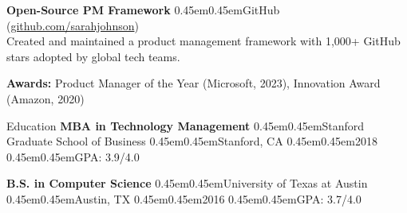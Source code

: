 \documentclass[10pt, letterpaper]{article}
\makeatletter
\renewcommand{\section}{%
  \@startsection{section}{1}{\z@}{10pt}{6pt}{%
    \Large\bfseries\color{black}%
  }%
}
\newcommand{\bull}{\kern0.45em\textbullet\kern0.45em}
\makeatother
\begin{document}
\textbf{Open-Source PM Framework} \bull GitHub (\href{https://github.com/sarahjohnson}{github.com/sarahjohnson}) \\
Created and maintained a product management framework with 1,000+ GitHub stars adopted by global tech teams.

\textbf{Awards:} Product Manager of the Year (Microsoft, 2023), Innovation Award (Amazon, 2020)

\section{Education}
\textbf{MBA in Technology Management} \bull Stanford Graduate School of Business \bull Stanford, CA \bull 2018 \bull GPA: 3.9/4.0

\textbf{B.S. in Computer Science} \bull University of Texas at Austin \bull Austin, TX \bull 2016 \bull GPA: 3.7/4.0
\end{document}
